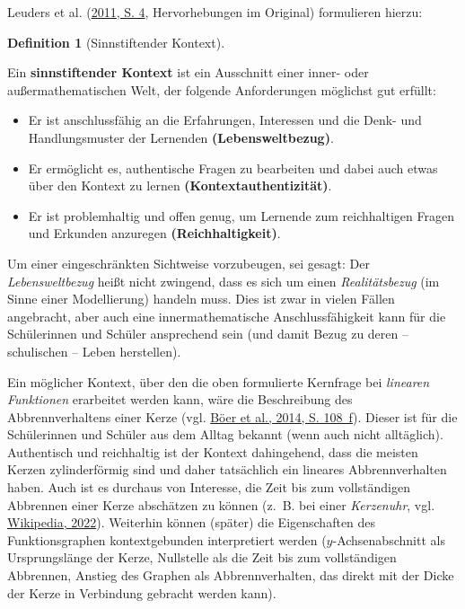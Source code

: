 \documentclass[
]{scrbook}
\providecommand{\tightlist}{%
  \setlength{\itemsep}{0pt}\setlength{\parskip}{0pt}}
\theoremstyle{definition}
\newtheorem{definition}{Definition}[chapter]
\theoremstyle{definition}
\theoremstyle{definition}
\theoremstyle{definition}
\theoremstyle{remark}
\begin{document}
Leuders et al. (\protect\hyperlink{ref-Leuders2011}{2011, S. 4}, Hervorhebungen im Original) formulieren hierzu:

\begin{definition}[Sinnstiftender Kontext]
\protect\hypertarget{def:Kontext}{}\label{def:Kontext}

Ein \textbf{sinnstiftender Kontext} ist ein Ausschnitt einer inner- oder außermathematischen Welt, der folgende Anforderungen möglichst gut erfüllt:

\begin{itemize}
\tightlist
\item
  Er ist anschlussfähig an die Erfahrungen, Interessen und die Denk- und Handlungsmuster der Lernenden \textbf{(Lebensweltbezug)}.
\item
  Er ermöglicht es, authentische Fragen zu bearbeiten und dabei auch etwas über den Kontext zu lernen \textbf{(Kontextauthentizität)}.
\item
  Er ist problemhaltig und offen genug, um Lernende zum reichhaltigen Fragen und Erkunden anzuregen \textbf{(Reichhaltigkeit)}.
\end{itemize}

\end{definition}

Um einer eingeschränkten Sichtweise vorzubeugen, sei gesagt: Der \emph{Lebensweltbezug} heißt nicht zwingend, dass es sich um einen \emph{Realitätsbezug} (im Sinne einer Modellierung) handeln muss. Dies ist zwar in vielen Fällen angebracht, aber auch eine innermathematische Anschlussfähigkeit kann für die Schülerinnen und Schüler ansprechend sein (und damit Bezug zu deren -- schulischen -- Leben herstellen).

Ein möglicher Kontext, über den die oben formulierte Kernfrage bei \emph{linearen Funktionen} erarbeitet werden kann, wäre die Beschreibung des Abbrennverhaltens einer Kerze (vgl. \protect\hyperlink{ref-Boeer2014}{Böer et al., 2014, S. 108~f}). Dieser ist für die Schülerinnen und Schüler aus dem Alltag bekannt (wenn auch nicht alltäglich). Authentisch und reichhaltig ist der Kontext dahingehend, dass die meisten Kerzen zylinderförmig sind und daher tatsächlich ein lineares Abbrennverhalten haben. Auch ist es durchaus von Interesse, die Zeit bis zum vollständigen Abbrennen einer Kerze abschätzen zu können (z.~B. bei einer \emph{Kerzenuhr}, vgl. \protect\hyperlink{ref-WikiKerze}{Wikipedia, 2022}). Weiterhin können (später) die Eigenschaften des Funktionsgraphen kontextgebunden interpretiert werden (\(y\)-Achsenabschnitt als Ursprungslänge der Kerze, Nullstelle als die Zeit bis zum vollständigen Abbrennen, Anstieg des Graphen als Abbrennverhalten, das direkt mit der Dicke der Kerze in Verbindung gebracht werden kann).
\end{document}
